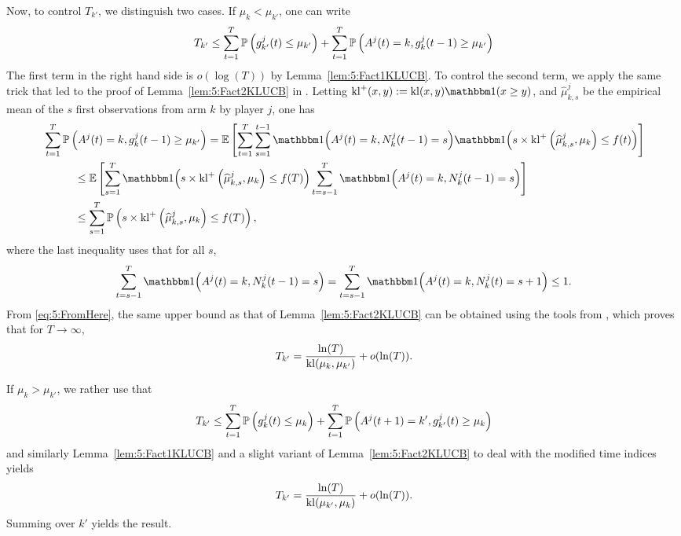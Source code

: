 Now, to control $T_{k'}$, we distinguish two cases. If $\mu_k < \mu_{k'}$, one can write
\[T_{k'} \leq \sum_{t=1}^T \mathbb{P}\left(g_{k'}^j(t) \leq \mu_{k'}\right) + \sum_{t=1}^T \mathbb{P}\left(A^j(t) = k, g_{k}^j(t-1) \geq \mu_{k'}\right)\]
The first term in the right hand side is $o(\log(T))$ by Lemma~\ref{lem:5:Fact1KLUCB}. To control the second term, we apply the same trick that led to the proof of Lemma~\ref{lem:5:Fact2KLUCB} in \cite{KLUCBJournal}.
Letting $\kl^+(x, y) := \kl(x, y) \indic(x \geq y)$,
and $\widehat{\mu}^j_{k,s}$ be the empirical mean of the $s$ first observations from arm $k$ by player $j$, one has
\begin{align}
  & \sum_{t=1}^T \bP\left(A^j(t) = k, g_{k}^j(t-1) \geq \mu_{k'}\right)
  =  \bE \left[ \sum_{t=1}^T\sum_{s=1}^{t-1} \indic{\left(A^j(t) = k , N^j_k(t-1) = s\right)}\indic{\left( s  \times \kl^+\left(\widehat{\mu}_{k,s}^j , \mu_k\right) \leq f(t)\right)} \right]\nonumber\\
  & \hspace{1cm} \leq \bE \left[ \sum_{s=1}^{T}\indic{\left( s \times \kl^+\left(\widehat{\mu}_{k,s}^j , \mu_k\right) \leq f(T)\right)}\sum_{t=s-1}^T \indic{\left(A^j(t) = k , N^j_k(t-1) = s\right)} \right] \nonumber \\
  & \hspace{1cm}  \leq \sum_{s=1}^T \bP\left( s \times \kl^+\left(\widehat{\mu}_{k,s}^j , \mu_k\right) \leq f(T)\right),\label{eq:5:FromHere}
\end{align}
where the last inequality uses that for all $s$, \[\sum_{t=s-1}^T \indic{\left(A^j(t) = k , N^j_k(t-1) = s\right)} = \sum_{t=s-1}^T \indic{\left(A^j(t) = k , N^j_k(t) = s + 1\right)} \leq 1.\]
From \eqref{eq:5:FromHere}, the same upper bound as that of Lemma~\ref{lem:5:Fact2KLUCB} can be obtained using the tools from \cite{KLUCBJournal}, which proves that for $T\to\infty$,
\[T_{k'} = \frac{\ln(T)}{\mathrm{kl}(\mu_k,\mu_{k'})} + o(\ln(T)).\]

If $\mu_k > \mu_{k'}$, we rather use that
\[T_{k'} \leq \sum_{t=1}^T \mathbb{P}\left(g_{k}^j(t) \leq \mu_{k}\right) + \sum_{t=1}^T \mathbb{P}\left(A^j(t+1) = k', g_{k'}^j(t) \geq \mu_{k}\right)\]
and similarly Lemma~\ref{lem:5:Fact1KLUCB} and a slight variant of Lemma~\ref{lem:5:Fact2KLUCB} to deal with the modified time indices yields
\[T_{k'} = \frac{\ln(T)}{\mathrm{kl}(\mu_{k'},\mu_{k})} + o(\ln(T)).\]
Summing over $k'$ yields the result.


